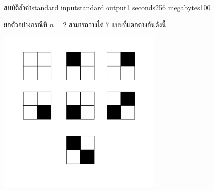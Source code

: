 \documentclass[11pt,a4paper]{article}
\begin{document}
\begin{problem}{สมบัติล้ำค่า}{standard input}{standard output}{1 seconds}{256 megabytes}{100}
\Note
\begin{note}
ยกตัวอย่างกรณีที่ $n = 2$ สามารถวางได้ 7 แบบที่แตกต่างกันดังนี้

\begin{center}
\includegraphics[width=8cm]{Sample.jpg}
\end{center}

\end{note}

\end{problem}
\end{document}
